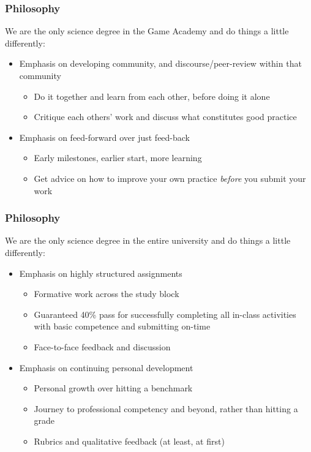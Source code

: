 \begin{frame}
	\frametitle{Philosophy}
	
	We are the only science degree in the Game Academy and do things a little differently:
	
	\begin{itemize}
		\pause\item Emphasis on developing community, and discourse/peer-review within that community
		\begin{itemize}
			\item Do it together and learn from each other, before doing it alone
			\item Critique each others' work and discuss what constitutes good practice
		\end{itemize}
		\pause\item Emphasis on feed-forward over just feed-back
		\begin{itemize}
			\item Early milestones, earlier start, more learning
			\item Get advice on how to improve your own practice \textit{before} you submit your work
		\end{itemize}
	\end{itemize}
\end{frame}

\begin{frame}
	\frametitle{Philosophy}
	
	We are the only science degree in the entire university and do things a little differently:

	\begin{itemize}
		\item Emphasis on highly structured assignments 
		\begin{itemize}
			\item Formative work across the study block
			\item Guaranteed 40\% pass for successfully completing all in-class activities with basic competence and submitting on-time
			\item Face-to-face feedback and discussion			
		\end{itemize}
		\pause\item Emphasis on continuing personal development
		\begin{itemize}
			\item Personal growth over hitting a benchmark
			\item Journey to professional competency and beyond, rather than hitting a grade
			\item Rubrics and qualitative feedback (at least, at first)			
		\end{itemize}
	\end{itemize}
\end{frame}

